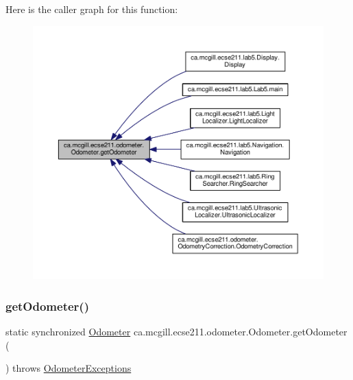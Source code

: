 Here is the caller graph for this function\+:
\nopagebreak
\begin{figure}[H]
\begin{center}
\leavevmode
\includegraphics[width=350pt]{classca_1_1mcgill_1_1ecse211_1_1odometer_1_1_odometer_a99171f11e34dea918fa9dd069d721439_icgraph}
\end{center}
\end{figure}
\mbox{\label{classca_1_1mcgill_1_1ecse211_1_1odometer_1_1_odometer_a4e069b5a96cd43b29af0785244a99b51}} 
\subsubsection{\texorpdfstring{get\+Odometer()}{getOdometer()}\hspace{0.1cm}{\footnotesize\ttfamily [2/2]}}
{\footnotesize\ttfamily static synchronized \hyperlink{classca_1_1mcgill_1_1ecse211_1_1odometer_1_1_odometer}{Odometer} ca.\+mcgill.\+ecse211.\+odometer.\+Odometer.\+get\+Odometer (\begin{DoxyParamCaption}{ }\end{DoxyParamCaption}) throws \hyperlink{classca_1_1mcgill_1_1ecse211_1_1odometer_1_1_odometer_exceptions}{Odometer\+Exceptions}\hspace{0.3cm}{\ttfamily [static]}}

